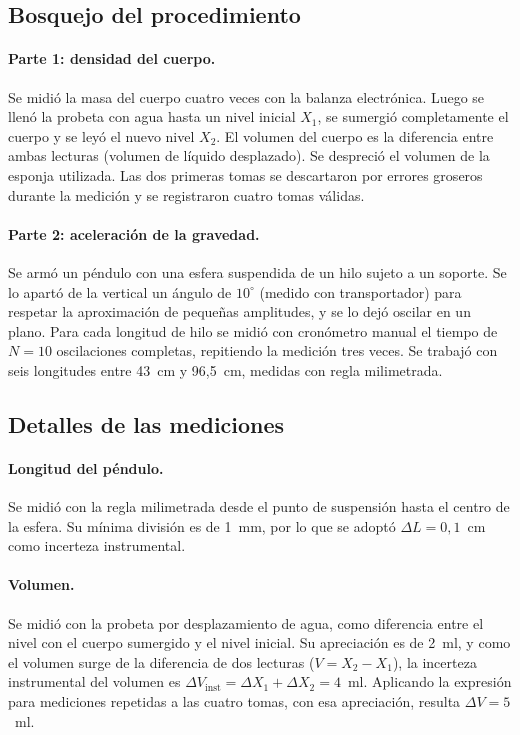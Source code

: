 \documentclass[12pt,a4paper]{article}
\begin{document}
\subsection{Bosquejo del procedimiento}
\paragraph{Parte 1: densidad del cuerpo.} Se midió la masa del cuerpo cuatro veces con la
balanza electrónica. Luego se llenó la probeta con agua hasta un nivel inicial $X_1$, se
sumergió completamente el cuerpo y se leyó el nuevo nivel $X_2$. El volumen del cuerpo es la
diferencia entre ambas lecturas (volumen de líquido desplazado). Se despreció el volumen de
la esponja utilizada. Las dos primeras tomas se descartaron por errores groseros durante la
medición y se registraron cuatro tomas válidas.

\paragraph{Parte 2: aceleración de la gravedad.} Se armó un péndulo con una esfera suspendida
de un hilo sujeto a un soporte. Se lo apartó de la vertical un ángulo de $10^\circ$ (medido
con transportador) para respetar la aproximación de pequeñas amplitudes, y se lo dejó
oscilar en un plano. Para cada longitud de hilo se midió con cronómetro manual el tiempo de
$N = 10$ oscilaciones completas, repitiendo la medición tres veces. Se trabajó con seis
longitudes entre 43~cm y 96,5~cm, medidas con regla milimetrada.

\subsection{Detalles de las mediciones}
\paragraph{Longitud del péndulo.} Se midió con la regla milimetrada desde el punto de
suspensión hasta el centro de la esfera. Su mínima división es de 1~mm, por lo que se adoptó
$\Delta L = 0{,}1$~cm como incerteza instrumental.

\paragraph{Volumen.} Se midió con la probeta por desplazamiento de agua, como diferencia
entre el nivel con el cuerpo sumergido y el nivel inicial. Su apreciación es de 2~ml, y como
el volumen surge de la diferencia de dos lecturas ($V = X_2 - X_1$), la incerteza
instrumental del volumen es $\Delta V_{\text{inst}} = \Delta X_1 + \Delta X_2 = 4$~ml.
Aplicando la expresión para mediciones repetidas a las cuatro tomas, con esa apreciación,
resulta $\Delta V = 5$~ml.
\end{document}
